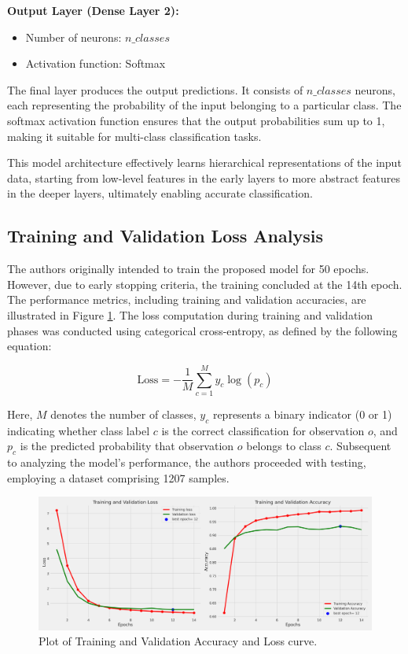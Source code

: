 \documentclass{article}
\begin{document}
\textbf{Output Layer (Dense Layer 2):}
\begin{itemize}
    \item Number of neurons: $n\_classes$
    \item Activation function: Softmax
\end{itemize}

The final layer produces the output predictions. It consists of $n\_classes$ neurons, each representing the probability of the input belonging to a particular class. The softmax activation function ensures that the output probabilities sum up to 1, making it suitable for multi-class classification tasks.

This model architecture effectively learns hierarchical representations of the input data, starting from low-level features in the early layers to more abstract features in the deeper layers, ultimately enabling accurate classification.



\subsection{Training and Validation Loss Analysis}
The authors originally intended to train the proposed model for 50 epochs. However, due to early stopping criteria, the training concluded at the 14th epoch. The performance metrics, including training and validation accuracies, are illustrated in Figure \ref{fig:training_plot_loss_acc}. The loss computation during training and validation phases was conducted using categorical cross-entropy, as defined by the following equation:

\begin{equation}
\text{Loss} = -\frac{1}{M} \sum_{c=1}^{M} y_c \log(p_c)
\end{equation}

Here, $M$ denotes the number of classes, $y_c$ represents a binary indicator (0 or 1) indicating whether class label $c$ is the correct classification for observation $o$, and $p_c$ is the predicted probability that observation $o$ belongs to class $c$. Subsequent to analyzing the model's performance, the authors proceeded with testing, employing a dataset comprising 1207 samples.

\begin{figure}[h]
    \centering
    \includegraphics[width=1.00\textwidth]{training_plot_loss_acc.png}
    \caption{Plot of Training and Validation Accuracy and Loss curve.}
    \label{fig:training_plot_loss_acc}
\end{figure}
\end{document}
